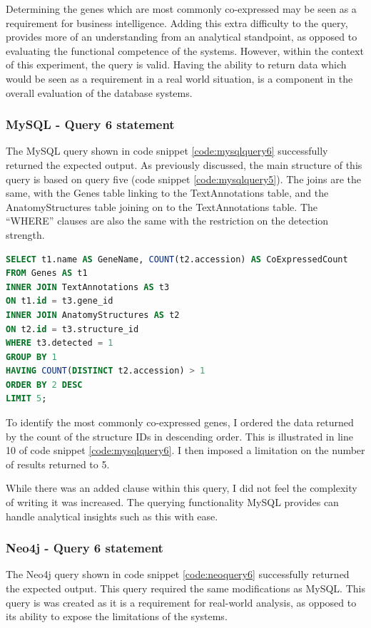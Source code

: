 Determining the genes which are most commonly co-expressed may be seen as a requirement for business intelligence. Adding this extra difficulty to the query, provides more of an understanding from an analytical standpoint, as opposed to evaluating the functional competence of the systems. However, within the context of this experiment, the query is valid. Having the ability to return data which would be seen as a requirement in a real world situation, is a component in the overall evaluation of the database systems.

\subsubsection*{MySQL - Query 6 statement}\label{mysqlquery6statement}
The MySQL query shown in code snippet \ref{code:mysqlquery6} successfully returned the expected output. As previously discussed, the main structure of this query is based on query five (code snippet \ref{code:mysqlquery5}). The joins are the same, with the Genes table linking to the TextAnnotations table, and the AnatomyStructures table joining on to the TextAnnotations table. The ``WHERE'' clauses are also the same with the restriction on the detection strength.

\begin{lstlisting}[language=SQL, caption=MySQL query 6 statement. Which Genes are most commonly co-expressed?., label=code:mysqlquery6]
SELECT t1.name AS GeneName, COUNT(t2.accession) AS CoExpressedCount
FROM Genes AS t1
INNER JOIN TextAnnotations AS t3
ON t1.id = t3.gene_id
INNER JOIN AnatomyStructures AS t2
ON t2.id = t3.structure_id
WHERE t3.detected = 1
GROUP BY 1
HAVING COUNT(DISTINCT t2.accession) > 1
ORDER BY 2 DESC
LIMIT 5;
\end{lstlisting}

To identify the most commonly co-expressed genes, I ordered the data returned by the count of the structure IDs in descending order. This is illustrated in line 10 of code snippet \ref{code:mysqlquery6}. I then imposed a limitation on the number of results returned to 5.

While there was an added clause within this query, I did not feel the complexity of writing it was increased. The querying functionality MySQL provides can handle analytical insights such as this with ease.

\subsubsection*{Neo4j - Query 6 statement}\label{neoquery6statement}
The Neo4j query shown in code snippet \ref{code:neoquery6} successfully returned the expected output. This query required the same modifications as MySQL. This query is was created as it is a requirement for real-world analysis, as opposed to its ability to expose the limitations of the systems.

